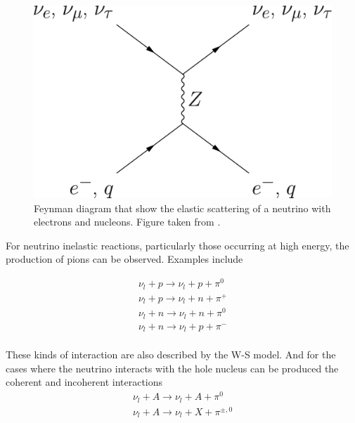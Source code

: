 \begin{figure}[!htb]
    \centering
    \includegraphics[scale=0.2]{Figures/Chapter1/neutral-current.png}
    \caption{Feynman diagram that show the elastic scattering of a neutrino with electrons and nucleons. Figure taken from \cite{NCImage}.}
    \label{fig:NeutrinoInt:NC}
\end{figure}

For neutrino inelastic reactions, particularly those occurring at high energy, the production of pions can be observed. Examples include

\begin{equation}
    \begin{split}
        \nu_l + p \rightarrow \nu_l + p +\pi^0 \\
        \nu_l + p \rightarrow \nu_l + n +\pi^+ \\
        \nu_l + n \rightarrow \nu_l + n +\pi^0 \\
        \nu_l + n \rightarrow \nu_l + p +\pi^- \\
    \end{split}
\end{equation}

These kinds of interaction are also described by the W-S model. And for the cases where the neutrino interacts with the hole nucleus can be produced the coherent and incoherent interactions
\begin{equation}
    \begin{split}
        \nu_l + A \rightarrow \nu_l + A +\pi^0 \\
        \nu_l + A \rightarrow \nu_l + X +\pi^{\pm,0} \\
    \end{split}
\end{equation}

